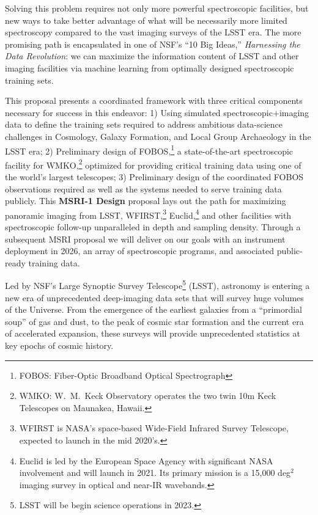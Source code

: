 Solving this problem requires not only more powerful spectroscopic facilities, but new ways to take better advantage of
what will be necessarily more limited spectroscopy compared to the vast imaging surveys of the LSST era.  The more
promising path is encapsulated in one of NSF's ``10 Big Ideas,'' \emph{Harnessing the Data Revolution}: we can maximize
the information content of LSST and other imaging facilities via machine learning from optimally designed spectroscopic
training sets.

This proposal presents a coordinated framework with three critical
components necessary for success in this endeavor: 1) Using simulated
spectroscopic$+$imaging data to define the training sets required to
address ambitious data-science challenges in Cosmology, Galaxy
Formation, and Local Group Archaeology in the LSST era; 2) Preliminary
design of FOBOS,\footnote{FOBOS: Fiber-Optic Broadband Optical
Spectrograph} a state-of-the-art spectroscopic facility for
WMKO,\footnote{WMKO: W.~M.\ Keck Observatory operates the two twin 10m
Keck Telescopes on Maunakea, Hawaii.} optimized for providing critical
training data using one of the world's largest telescopes; 3)
Preliminary design of the coordinated FOBOS observations required as
well as the systems needed to serve training data publicly.  This {\bf
MSRI-1 Design} proposal lays out the path for maximizing panoramic
imaging from LSST, WFIRST,\footnote{WFIRST is NASA's space-based
Wide-Field Infrared Survey Telescope, expected to launch in the mid
2020's.} Euclid,\footnote{Euclid is led by the European Space Agency
with significant NASA involvement and will launch in 2021. Its primary
mission is a 15,000 deg$^2$ imaging survey in optical and near-IR
wavebands.} and other facilities with spectroscopic follow-up
unparalleled in depth and sampling density.  Through a subsequent MSRI
proposal we will deliver on our goals with an instrument deployment in
2026, an array of spectroscopic programs, and associated public-ready
training data.



Led by NSF's Large Synoptic Survey Telescope\footnote{
%
LSST will be begin science operations in 2023.}
%
(LSST), astronomy is entering a new era of unprecedented deep-imaging data sets that will survey huge volumes of the
Universe.  From the emergence of the earliest galaxies from a ``primordial soup'' of gas and dust, to the peak of
cosmic star formation and the current era of accelerated expansion, these surveys will provide unprecedented statistics
at key epochs of cosmic history.

